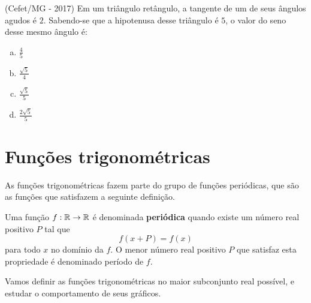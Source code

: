  \begin{exer}
 (Cefet/MG - 2017) Em um triângulo retângulo, a tangente de um de seus ângulos agudos é $2$. Sabendo-se que a hipotenusa desse triângulo é $5$, o valor do seno desse mesmo ângulo é:
 \begin{enumerate}[a)]
 \item $\frac{4}{5}$
 \item $\frac{\sqrt{5}}{4}$
 \item $\frac{\sqrt{5}}{5}$
 \item $\frac{2\sqrt{5}}{5}$
 \end{enumerate}
 \end{exer}



  \chapter{Funções trigonométricas}

  As funções trigonométricas fazem parte do grupo de funções periódicas, que são as funções que satisfazem a seguinte definição.

  \begin{defi}
   Uma função $f: \mathbb{R} \rightarrow \mathbb{R}$ é denominada \textbf{periódica} quando existe um número real positivo $P$ tal que
   \[f(x + P)= f(x)\]
   para todo $x$ no domínio da $f$. O menor número real positivo $P$ que satisfaz esta propriedade é denominado período de $f$.
  \end{defi}

  Vamos definir as funções trigonométricas no maior subconjunto real possível, e estudar o comportamento de seus gráficos.


